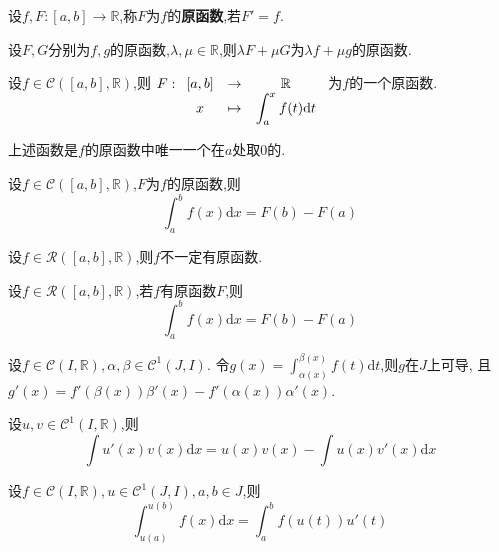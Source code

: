 \begin{deff}
    设$f,F:[a,b]\to\mathbb{R}$,称$F$为$f$的\textbf{原函数},若$F'=f$.
\end{deff}

\begin{prop}
    设$F,G$分别为$f,g$的原函数,$\lambda,\mu\in\mathbb{R}$,则$\lambda F+\mu G$为$\lambda f+\mu g$的原函数.
\end{prop}

\begin{thm}
    设$f\in\mathcal{C}([a,b],\mathbb{R})$,则
    $F:\begin{array}[t]{ccc} [a,b] & \to & \mathbb{R} \\ x & \mapsto & \displaystyle\int_a^x f(t)\mathrm{d}t \end{array}$
    为$f$的一个原函数.
\end{thm}

\begin{rqq}
    上述函数是$f$的原函数中唯一一个在$a$处取0的.
\end{rqq}

\begin{thm}
    设$f\in\mathcal{C}([a,b],\mathbb{R})$,$F$为$f$的原函数,则\[ \int_a^b f(x)\mathrm{d}x=F(b)-F(a) \]
\end{thm}

\begin{rqq}
    设$f\in\mathcal{R}([a,b],\mathbb{R})$,则$f$不一定有原函数.
\end{rqq}

\begin{thm}
    设$f\in\mathcal{R}([a,b],\mathbb{R})$,若$f$有原函数$F$,则\[ \int_a^b f(x)\mathrm{d}x=F(b)-F(a) \]
\end{thm}

\begin{prop}
    设$f\in\mathcal{C}(I,\mathbb{R}),\alpha,\beta\in\mathcal{C}^1(J,I)$.
    令$g(x)=\int_{\alpha(x)}^{\beta(x)}f(t)\mathrm{d}t$,则$g$在$J$上可导,
    且$g'(x)=f'(\beta(x))\beta'(x)-f'(\alpha(x))\alpha'(x)$.
\end{prop}

\begin{prop}
    设$u,v\in\mathcal{C}^1(I,\mathbb{R})$,则\[ \int u'(x)v(x)\mathrm{d}x=u(x)v(x)-\int u(x)v'(x)\mathrm{d}x \]
\end{prop}

\begin{prop}
    设$f\in\mathcal{C}(I,\mathbb{R}),u\in\mathcal{C}^1(J,I),a,b\in J$,则
    \[ \int_{u(a)}^{u(b)}f(x)\mathrm{d}x=\int_a^b f(u(t))u'(t) \]
\end{prop}

